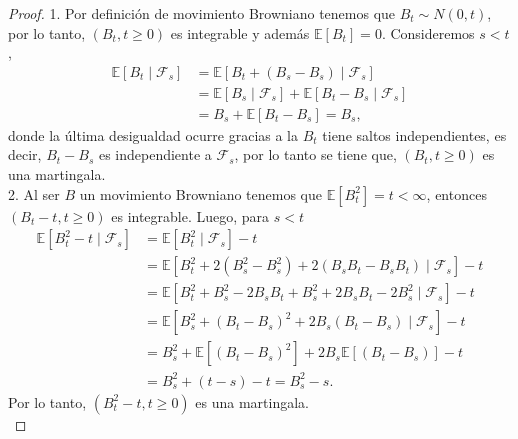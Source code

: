 \begin{proof}
1. Por definición de movimiento Browniano tenemos que $B_t \sim N(0, t)$, por lo tanto, $(B_t, t \geq 0)$ es integrable y además $\mathbb{E}[B_t] = 0$. Consideremos $s < t$, 
\begin{align*}
\mathbb{E}[B_t \mid \mathcal{F}_s] & = \mathbb{E}[B_t + (B_s - B_s) \mid \mathcal{F}_s] \\
& = \mathbb{E}[B_s \mid \mathcal{F}_s] + \mathbb{E}[B_t - B_s \mid \mathcal{F}_s] \\
& = B_s + \mathbb{E}[B_t - B_s] = B_s,
\end{align*}
donde la última desigualdad ocurre gracias a la $B_t$ tiene saltos independientes, es decir, $B_t - B_s$ es independiente a $\mathcal{F}_s$, por lo tanto se tiene que, $(B_t, t \geq 0)$ es una martingala. \\

2. Al ser $B$ un movimiento Browniano tenemos que $\mathbb{E}[B^2_t] = t < \infty$, entonces $(B_t - t, t \geq 0)$ es integrable. Luego, para $s < t$
\begin{align*}
\mathbb{E}[B^2_t - t \mid \mathcal{F}_s] & = \mathbb{E}[B^2_t \mid \mathcal{F}_s] - t \\
& = \mathbb{E}[B^2_t + 2(B^2_s - B^2_s) + 2(B_s B_t - B_s B_t) \mid \mathcal{F}_s] - t \\
& = \mathbb{E}[B^2_t + B^2_s - 2B_s B_t + B^2_s + 2B_s B_t - 2B^2_s \mid \mathcal{F}_s] - t \\
& = \mathbb{E}[B^2_s + (B_t - B_s)^2 + 2 B_s (B_t - B_s) \mid \mathcal{F}_s ] - t \\
& = B^2_s + \mathbb{E}[(B_t - B_s)^2] + 2 B_s \mathbb{E}[(B_t - B_s)] - t \\
& = B^2_s + (t-s) - t = B^2_s - s.
\end{align*}
Por lo tanto, $(B^2_t - t, t \geq 0)$ es una martingala. \\


\end{proof}

